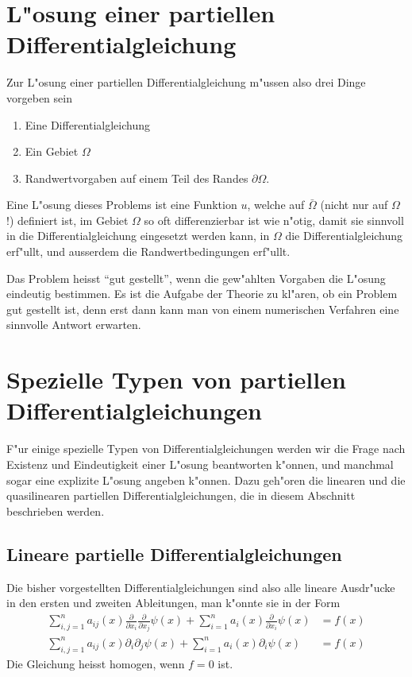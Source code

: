 \section{L"osung einer partiellen Differentialgleichung\label{klassifikation:loesung}}
Zur L"osung einer partiellen Differentialgleichung m"ussen also
drei Dinge vorgeben sein
\begin{enumerate}
\item Eine Differentialgleichung
\item Ein Gebiet $\Omega$
\item Randwertvorgaben auf einem Teil des Randes $\partial\Omega$.
\end{enumerate}
\begin{definition}
Eine L"osung dieses Problems ist eine Funktion $u$, welche
auf $\bar\Omega$ (nicht nur auf $\Omega$!) definiert ist,
im Gebiet $\Omega$ so oft differenzierbar ist wie n"otig, damit
sie sinnvoll in die Differentialgleichung eingesetzt werden kann,
in $\Omega$ die Differentialgleichung erf"ullt,
und ausserdem die Randwertbedingungen erf"ullt.
\end{definition}

Das Problem heisst ``gut gestellt'', wenn die gew"ahlten Vorgaben
die L"osung eindeutig bestimmen.
Es ist die Aufgabe der Theorie zu kl"aren, ob ein Problem
gut gestellt ist, denn erst dann kann man von einem numerischen
Verfahren eine sinnvolle Antwort erwarten.

\section{Spezielle Typen von partiellen Differentialgleichungen\label{klassifikation:spezielletypen}}
F"ur einige spezielle Typen von Differentialgleichungen werden wir
die Frage nach Existenz und Eindeutigkeit einer L"osung beantworten
k"onnen, und manchmal sogar eine explizite L"osung angeben k"onnen.
Dazu geh"oren die linearen und die quasilinearen partiellen
Differentialgleichungen, die in diesem Abschnitt beschrieben werden.

\subsection{Lineare partielle Differentialgleichungen\label{klassifikation:linear}}
Die bisher vorgestellten Differentialgleichungen sind also alle lineare
Ausdr"ucke in den ersten und zweiten Ableitungen, man k"onnte sie in der
Form
\begin{align*}
\sum_{i,j=1}^n a_{ij}(x)\frac{\partial}{\partial x_i} \frac{\partial}{\partial x_j}\psi(x)
+\sum_{i=1}^na_i(x)\frac{\partial}{\partial x_i}\psi(x)&=f(x)
\\
\sum_{i,j=1}^n a_{ij}(x)\partial_i \partial_j\psi(x)
+\sum_{i=1}^na_i(x)\partial_i\psi(x)&=f(x)
\end{align*}
Die Gleichung heisst homogen, wenn $f=0$ ist.

